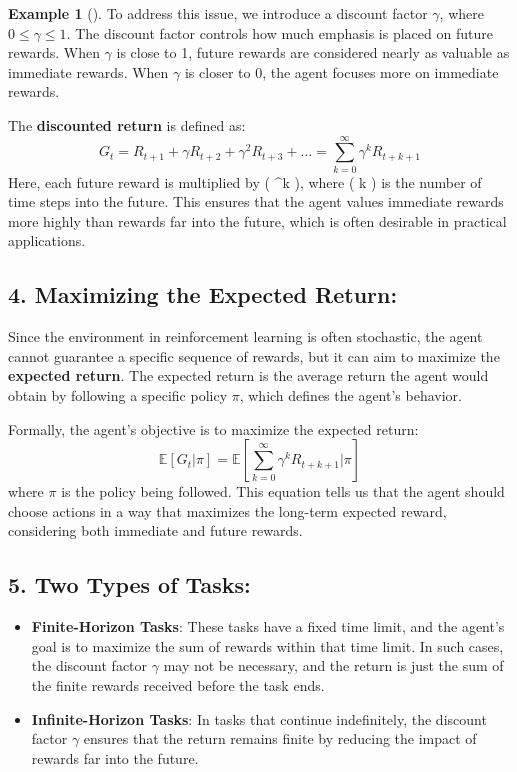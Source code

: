 \documentclass[
  letterpaper,
]{krantz}
\providecommand{\tightlist}{%
  \setlength{\itemsep}{0pt}\setlength{\parskip}{0pt}}\usepackage{longtable,booktabs,array}
\theoremstyle{plain}
\theoremstyle{definition}
\newtheorem{example}{Example}[chapter]
\theoremstyle{definition}
\theoremstyle{remark}
\begin{document}
\begin{example}[]
To address this issue, we introduce a discount factor \(\gamma\), where
\(0\leq \gamma \leq 1\). The discount factor controls how much emphasis
is placed on future rewards. When \(\gamma\) is close to 1, future
rewards are considered nearly as valuable as immediate rewards. When
\(\gamma\) is closer to 0, the agent focuses more on immediate rewards.

The \textbf{discounted return} is defined as: \[
G_t = R_{t+1} + \gamma R_{t+2} + \gamma^2 R_{t+3} + \dots 
    = \sum_{k=0}^{\infty} \gamma^k R_{t+k+1}
\] Here, each future reward is multiplied by ( \gamma\^{}k ), where ( k
) is the number of time steps into the future. This ensures that the
agent values immediate rewards more highly than rewards far into the
future, which is often desirable in practical applications.

\subsection{\texorpdfstring{4. \textbf{Maximizing the Expected
Return}:}{4. Maximizing the Expected Return:}}\label{maximizing-the-expected-return}

Since the environment in reinforcement learning is often stochastic, the
agent cannot guarantee a specific sequence of rewards, but it can aim to
maximize the \textbf{expected return}. The expected return is the
average return the agent would obtain by following a specific policy
\(\pi\), which defines the agent's behavior.

Formally, the agent's objective is to maximize the expected return: \[
    \mathbb{E}[G_t | \pi] 
            = \mathbb{E}\left[\sum_{k=0}^{\infty} \gamma^k R_{t+k+1} \Big| \pi\right]
\] where \(\pi\) is the policy being followed. This equation tells us
that the agent should choose actions in a way that maximizes the
long-term expected reward, considering both immediate and future
rewards.

\subsection{\texorpdfstring{5. \textbf{Two Types of
Tasks}:}{5. Two Types of Tasks:}}\label{two-types-of-tasks}

\begin{itemize}
\tightlist
\item
  \textbf{Finite-Horizon Tasks}: These tasks have a fixed time limit,
  and the agent's goal is to maximize the sum of rewards within that
  time limit. In such cases, the discount factor \(\gamma\) may not be
  necessary, and the return is just the sum of the finite rewards
  received before the task ends.
\item
  \textbf{Infinite-Horizon Tasks}: In tasks that continue indefinitely,
  the discount factor \(\gamma\) ensures that the return remains finite
  by reducing the impact of rewards far into the future.
\end{itemize}


\end{example}
\end{document}

